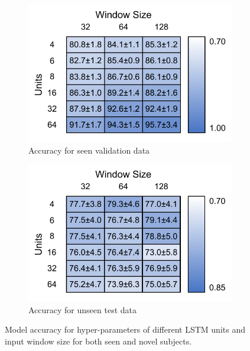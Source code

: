 \begin{figure}[!hbt]
    \centering
    \begin{subfigure}{.4\linewidth}
        \centering
        \includegraphics[width=\textwidth]{content/4-LSTM_Behaviour/results/window_v_units_train.pdf}
	 \caption{Accuracy for seen validation data}
        \label{fig:model_size_hyper_param_train}
    \end{subfigure}
    \begin{subfigure}{.4\linewidth}
        \centering
        \includegraphics[width=\textwidth]{content/4-LSTM_Behaviour/results/window_v_units_test.pdf}
        \caption{Accuracy for unseen test data}
        \label{fig:model_size_hyper_param_test}
    \end{subfigure}
    \caption{Model accuracy for hyper-parameters of different LSTM units and input window size for both seen and novel subjects.}
\label{fig:model_size_hyper_param}
\end{figure}

